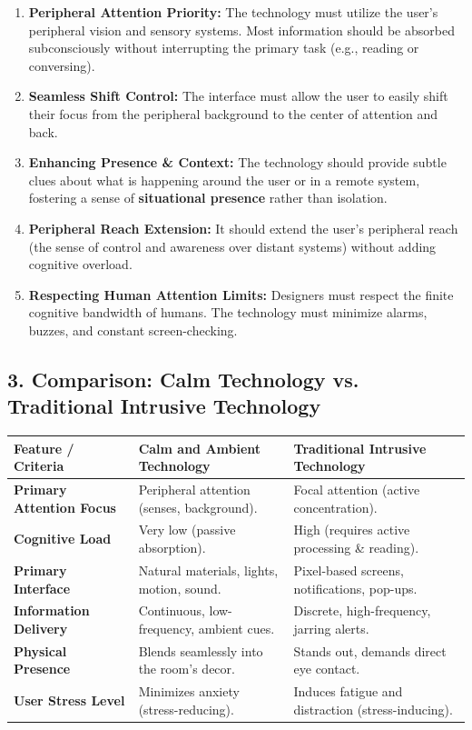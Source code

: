\begin{enumerate}
  \item \textbf{Peripheral Attention Priority:} The technology must utilize the user's peripheral vision and sensory systems. Most information should be absorbed subconsciously without interrupting the primary task (e.g., reading or conversing).
  \item \textbf{Seamless Shift Control:} The interface must allow the user to easily shift their focus from the peripheral background to the center of attention and back.
  \item \textbf{Enhancing Presence \& Context:} The technology should provide subtle clues about what is happening around the user or in a remote system, fostering a sense of \textbf{situational presence} rather than isolation.
  \item \textbf{Peripheral Reach Extension:} It should extend the user's peripheral reach (the sense of control and awareness over distant systems) without adding cognitive overload.
  \item \textbf{Respecting Human Attention Limits:} Designers must respect the finite cognitive bandwidth of humans. The technology must minimize alarms, buzzes, and constant screen-checking.
\end{enumerate}


\subsection{3. Comparison: Calm Technology vs. Traditional Intrusive Technology}

\begin{table}[H]
\centering
\begin{tabular}{|p{}|p{}|p{}|}
\hline
Feature / Criteria & Calm and Ambient Technology & Traditional Intrusive Technology \\
\hline
\textbf{Primary Attention Focus} & Peripheral attention (senses, background). & Focal attention (active concentration). \\
\hline
\textbf{Cognitive Load} & Very low (passive absorption). & High (requires active processing \& reading). \\
\hline
\textbf{Primary Interface} & Natural materials, lights, motion, sound. & Pixel-based screens, notifications, pop-ups. \\
\hline
\textbf{Information Delivery} & Continuous, low-frequency, ambient cues. & Discrete, high-frequency, jarring alerts. \\
\hline
\textbf{Physical Presence} & Blends seamlessly into the room's decor. & Stands out, demands direct eye contact. \\
\hline
\textbf{User Stress Level} & Minimizes anxiety (stress-reducing). & Induces fatigue and distraction (stress-inducing). \\
\hline
\end{tabular}
\end{table}


